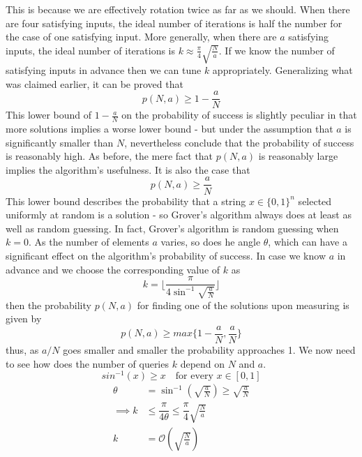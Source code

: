 This is because we are effectively rotation twice as far as we should. When there are four satisfying inputs, the ideal number of iterations is half the number for the case of one satisfying input. More generally, when there are $a$ satisfying inputs, the ideal number of iterations is $k\approx \frac{\pi}{4}\sqrt{\frac{N}{a}}$. If we know the number of satisfying inputs in advance then we can tune $k$ appropriately. Generalizing what was claimed earlier, it can be proved that 
\[
p(N,a) \geq 1 -\dfrac{a}{N}
\]
This lower bound of $1-\frac{a}{N}$ on the probability of success is slightly peculiar in that more solutions implies a worse lower bound - but under the assumption that $a$ is significantly smaller than $N$, nevertheless conclude that the probability of success is reasonably high. As before, the mere fact that $p(N,a)$ is reasonably large implies the algorithm's usefulness.
It is also the case that
\[
p(N,a) \geq \frac{a}{N}
\]
This lower bound describes the probability that a string $x \in \{0,1\}^n$ selected uniformly at random is a solution - so Grover's algorithm always does at least as well as random guessing. In fact, Grover's algorithm is random guessing when $k=0$.
As the number of elements $a$ varies, so does he angle $\theta$, which can have a significant effect on the algorithm's probability of success.
In case we know $a$ in advance and we choose the corresponding value of $k$ as 
\[
k=\lfloor \dfrac{\pi}{4\sin^{-1}\sqrt{\frac{a}{N}} }\rfloor
\]
then the probability $p(N,a)$ for finding one of the solutions upon measuring is given by
\[
p(N,a) \geq max\{1-\dfrac{a}{N},\dfrac{a}{N}\}
\]
thus, as $a/N$ goes smaller and smaller the probability approaches 1.
We now need to see how does the number of queries $k$ depend on $N$ and $a$.
\[
sin^{-1} (x) \geq x \quad \text{for every $x \in [0,1]$}
\]
\begin{align*}
    \theta &=\sin^{-1} \left(\sqrt{\frac{a}{N}}\right) \geq \sqrt{\frac{a}{N}}\\
    \implies k&\leq \dfrac{\pi}{4\theta} \leq \dfrac{\pi}{4}\sqrt{\frac{N}{a}}\\
    k&=\mathcal{O}\left(\sqrt{\frac{N}{a}}\right)
\end{align*}

